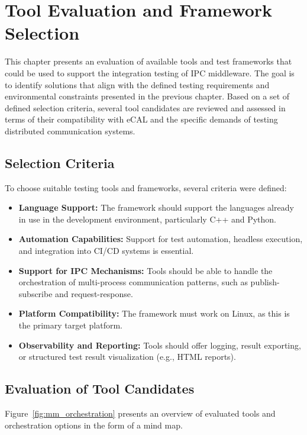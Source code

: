 \clearpage
\section{Tool Evaluation and Framework Selection}

This chapter presents an evaluation of available tools and test frameworks that could be used to support the integration testing of IPC middleware. The goal is to identify solutions that align with the defined testing requirements and environmental constraints presented in the previous chapter. Based on a set of defined selection criteria, several tool candidates are reviewed and assessed in terms of their compatibility with eCAL and the specific demands of testing distributed communication systems.

\subsection{Selection Criteria}

To choose suitable testing tools and frameworks, several criteria were defined:

\begin{itemize}
	\item \textbf{Language Support:} The framework should support the languages already in use in the development environment, particularly C++ and Python.
	\item \textbf{Automation Capabilities:} Support for test automation, headless execution, and integration into CI/CD systems is essential.
	\item \textbf{Support for IPC Mechanisms:} Tools should be able to handle the orchestration of multi-process communication patterns, such as publish-subscribe and request-response.
	\item \textbf{Platform Compatibility:} The framework must work on Linux, as this is the primary target platform.
	\item \textbf{Observability and Reporting:} Tools should offer logging, result exporting, or structured test result visualization (e.g., HTML reports).
\end{itemize}

\subsection{Evaluation of Tool Candidates}

Figure~\ref{fig:mm_orchestration} presents an overview of evaluated tools and orchestration options in the form of a mind map.


